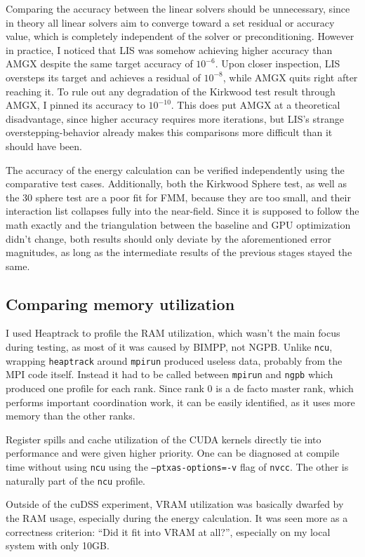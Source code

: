 Comparing the accuracy between the linear solvers should be unnecessary, since in theory all linear solvers aim to converge toward a set residual or accuracy value, which is completely independent of the solver or preconditioning.
However in practice, I noticed that LIS was somehow achieving higher accuracy than AMGX despite the same target accuracy of $10^{-6}$.
Upon closer inspection, LIS oversteps its target and achieves a residual of $10^{-8}$, while AMGX quits right after reaching it.
To rule out any degradation of the Kirkwood test result through AMGX, I pinned its accuracy to $10^{-10}$.
This does put AMGX at a theoretical disadvantage, since higher accuracy requires more iterations, but LIS's strange overstepping-behavior already makes this comparisons more difficult than it should have been.

The accuracy of the energy calculation can be verified independently using the comparative test cases.
Additionally, both the Kirkwood Sphere test, as well as the 30 sphere test are a poor fit for FMM, because they are too small, and their interaction list collapses fully into the near-field.
Since it is supposed to follow the math exactly and the triangulation between the baseline and GPU optimization didn't change, both results should only deviate by the aforementioned error magnitudes, as long as the intermediate results of the previous stages stayed the same.

\subsection{Comparing memory utilization}
\label{sec:evaluation-experimental-setup-comparing-memory-utilization}

I used Heaptrack to profile the RAM utilization, which wasn't the main focus during testing, as most of it was caused by BIMPP, not NGPB.
Unlike \texttt{ncu}, wrapping \texttt{heaptrack} around \texttt{mpirun} produced useless data, probably from the MPI code itself. 
Instead it had to be called between \texttt{mpirun} and \texttt{ngpb} which produced one profile for each rank. 
Since rank 0 is a de facto master rank, which performs important coordination work, it can be easily identified, as it uses more memory than the other ranks.

Register spills and cache utilization of the CUDA kernels directly tie into performance and were given higher priority.
One can be diagnosed at compile time without using \texttt{ncu} using the \texttt{--ptxas-options=-v} flag of \texttt{nvcc}.
The other is naturally part of the \texttt{ncu} profile.

Outside of the cuDSS experiment, VRAM utilization was basically dwarfed by the RAM usage, especially during the energy calculation. 
It was seen more as a correctness criterion: ``Did it fit into VRAM at all?'', especially on my local system with only 10GB.